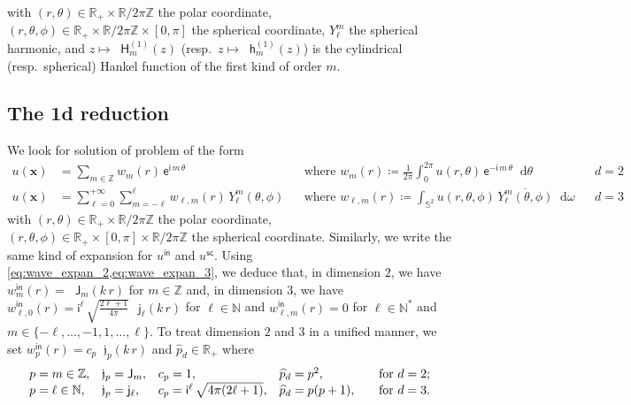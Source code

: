 \documentclass[12pt,a4paper]{article}
\theoremstyle{definition}
\theoremstyle{plain}
\theoremstyle{remark}
\newcommand{\bbN}{\mathbb{N}}
\newcommand{\bbR}{\mathbb{R}}
\newcommand{\bbS}{\mathbb{S}}
\newcommand{\bbZ}{\mathbb{Z}}
\newcommand{\ex}{\mathsf{e}}
\newcommand{\im}{\mathsf{i}}
\newcommand{\bJ}{\mathop{}\!\mathsf{J}}
\newcommand{\Hu}{\mathop{}\!\mathsf{H}^{(1)}}
\newcommand{\bj}{\mathop{}\!\mathsf{j}}
\newcommand{\hu}{\mathop{}\!\mathsf{h}^{(1)}}
\newcommand{\frj}{\mathop{}\!\mathfrak{j}}
\newcommand{\di}[1]{\mathop{}\!\mathrm{d}#1}
\newcommand{\vx}{\boldsymbol{x}}
\newcommand{\inc}{\mathsf{in}}
\newcommand{\sca}{\mathsf{sc}}
\begin{document}
with $(r, \theta) \in \bbR_+ \times \bbR / 2\pi\bbZ$ the polar coordinate,
$(r, \theta, \phi) \in \bbR_+ \times \bbR / 2\pi\bbZ \times [0, \pi]$ the spherical coordinate, $Y_\ell^m$ the spherical harmonic, and $z \mapsto \Hu_m(z)$ (resp.\ $z \mapsto \hu_m(z)$) is the cylindrical (resp.\ spherical) Hankel function of the first kind of order $m$.

\subsection{The 1d reduction}

We look for solution of problem of the form
\begin{align*}
    u(\vx)
     & = \sum_{m \in \bbZ} w_m(r)\, \ex^{\im\, m\, \theta}
     &                                                                                           & \text{where } w_m(r) \coloneqq \frac{1}{2\pi} \int_0^{2\pi} u(r,\theta)\, \ex^{-\im\, m\, \theta} \di{\theta}
     &                                                                                           & d = 2                                                                                                                   \\
    u(\vx)
     & = \sum_{\ell = 0}^{+\infty} \sum_{m = -\ell}^\ell w_{\ell, m}(r)\, Y_\ell^m(\theta, \phi)
     &                                                                                           & \text{where } w_{\ell, m}(r) \coloneqq \int_{\bbS^2} u(r, \theta, \phi)\, \overline{Y_\ell^m(\theta, \phi)} \di{\omega}
     &                                                                                           & d = 3
\end{align*}
with $(r, \theta) \in \bbR_+ \times \bbR / 2\pi\bbZ$ the polar coordinate,
$(r, \theta, \phi) \in \bbR_+ \times [0, \pi] \times \bbR / 2\pi\bbZ$ the spherical coordinate.
Similarly, we write the same kind of expansion for $u^\inc$ and $u^\sca$.
Using \cref{eq:wave_expan_2,eq:wave_expan_3}, we deduce that, in dimension $2$, we have $w_m^\inc(r) = \bJ_m(k\, r)$ for $m \in \bbZ$ and, in dimension $3$, we have $w_{\ell, 0}^\inc(r) = \im^\ell\, \sqrt{\frac{2\ell+1}{4\pi}}\, \bj_\ell(k\, r)$ for $\ell \in \bbN$ and $w_{\ell, m}^\inc(r) = 0$ for $\ell \in \bbN^*$ and $m \in \{-\ell, \ldots, -1, 1, \ldots, \ell\}$.
To treat dimension $2$ and $3$ in a unified manner, we set $w_p^\inc(r) = c_p\frj_p(k\, r)$ and $\widehat{p}_d \in \bbR_+$ where
\[
    \begin{array}{l@{\quad}l@{\quad}l@{\quad}l@{\qquad}l}
        p = m \in \bbZ,    & \frj_p = \bJ_m,    & c_p = 1,                                & \widehat{p}_d = p^2,    & \text{for } d = 2; \\
        p = \ell \in \bbN, & \frj_p = \bj_\ell, & c_p = \im^\ell\, \sqrt{4\pi (2\ell+1)}, & \widehat{p}_d = p(p+1), & \text{for } d = 3.
    \end{array}
\]
\end{document}
